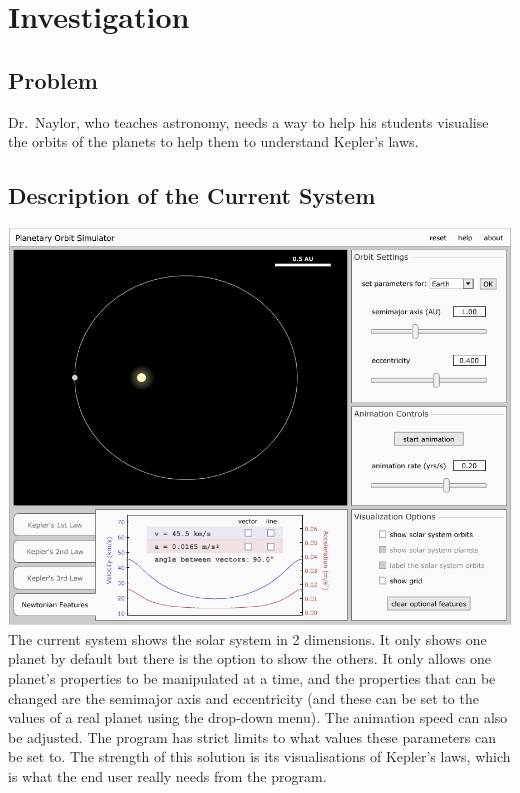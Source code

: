 \documentclass[a4paper,11pt,titlepage]{article}
\begin{document}
\section{Investigation}

\subsection{Problem}
Dr.~Naylor, who teaches astronomy, needs a way to help his students visualise
the orbits of the planets to help them to understand Kepler's laws. 

\subsection{Description of the Current System}
\includegraphics[width=\textwidth]{existing-solution.png}
The current system shows the solar system in 2 dimensions. It only shows one
planet by default but there is the option to show the others. It only allows one
planet's properties to be manipulated at a time, and the properties that can be
changed are the semimajor axis and eccentricity (and these can be set to the
values of a real planet using the drop-down menu). The animation speed can also
be adjusted. The program has strict limits to what values these parameters can
be set to. The strength of this solution is its visualisations of Kepler's laws,
which is what the end user really needs from the program. 
\end{document}
